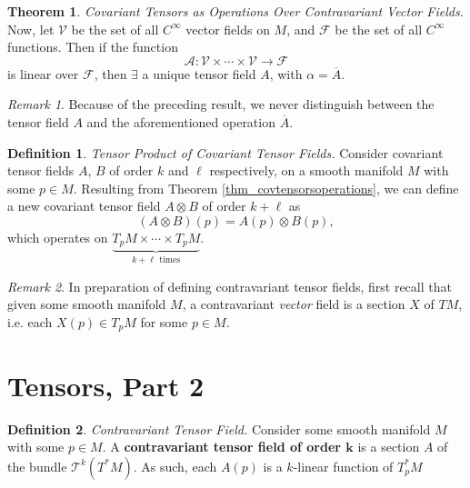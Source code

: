 \documentclass[10pt,landscape]{article}
\theoremstyle{definition}
\newtheorem{definition}{Definition}[section]
\theoremstyle{theorem}
\newtheorem{theorem}{Theorem}[section]
\theoremstyle{summary}
\theoremstyle{remark}
\newtheorem*{remark}{Remark}
\newcommand{\Ci}{C^\infty}
\begin{document}
\begin{multicols*}{3}
\begin{theorem}{\textit{Covariant Tensors as Operations Over Contravariant Vector Fields.}}
    Now, let $\mathcal{V}$ be the set of all $\Ci$ vector fields on $M$, and $\mathcal{F}$ be the set of all $\Ci$ functions. Then if the function
    \begin{equation}
        \mathcal{A}:\mathcal{V}\times\cdots\times\mathcal{V}\rightarrow\mathcal{F}
    \end{equation}
    is linear over $\mathcal{F}$, then $\exists$ a unique tensor field $A$, with $\alpha=\overline{A}$. 
\end{theorem}

\begin{remark}
    Because of the preceding result, we never distinguish between the tensor field $A$ and the aforementioned operation $\overline{A}$.
\end{remark}

\theoremstyle{definition}
\begin{definition}{\textit{Tensor Product of Covariant Tensor Fields.}}
    Consider covariant tensor fields $A$, $B$ of order $k$ and $\ell$ respectively, on a smooth manifold $M$ with some $p\in M$. Resulting from Theorem \ref{thm_covtensorsoperations}, we can define a new covariant tensor field $A\otimes B$ of order $k+\ell$ as
    \begin{equation}
        (A\otimes B)(p) = A(p)\otimes B(p),
    \end{equation}
    which operates on $\underbrace{T_pM\times\cdots\times T_pM}_{k+\ell\text{ times}}$.
\end{definition}

\begin{remark}
    In preparation of defining contravariant tensor fields, first recall that given some smooth manifold $M$, a contravariant \textit{vector} field is a section $X$ of $TM$, i.e. each $X(p)\in T_pM$ for some $p\in M$.
\end{remark}

\section{Tensors, Part 2}

\theoremstyle{definition}
\begin{definition}{\textit{Contravariant Tensor Field.}}
    Consider some smooth manifold $M$ with some $p\in M$. A \textbf{contravariant tensor field of order $\bm{k}$} is a section $A$ of the bundle $\mathcal{T}^k(T^*M)$. As such, each $A(p)$ is a $k$-linear function of $T_p^*M$


\end{definition}
\end{multicols*}
\end{document}
